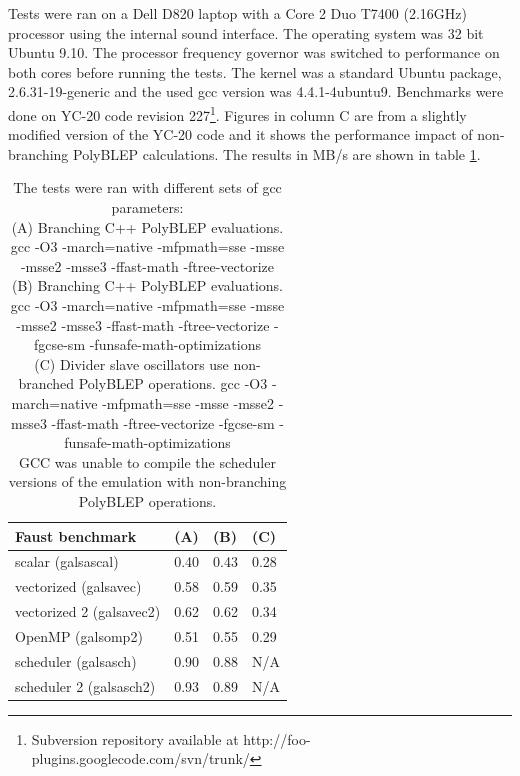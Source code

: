\documentclass[11pt,a4paper]{article}
\begin{document}
Tests were ran on a Dell D820 laptop with a Core 2 Duo T7400 (2.16GHz) processor using the internal sound interface. The operating system was 32 bit Ubuntu 9.10. The processor frequency governor was switched to performance on both cores before running the tests. The kernel was a standard Ubuntu package, 2.6.31-19-generic and the used gcc version was 4.4.1-4ubuntu9. Benchmarks were done on YC-20 code revision 227\footnote{Subversion repository available at http://foo-plugins.googlecode.com/svn/trunk/}. Figures in column C are from a slightly modified version of the YC-20 code and it shows the performance impact of non-branching PolyBLEP calculations. The results in MB/s are shown in table \ref{table:performance}.

\begin{table}[h]
 \begin{center}
\begin{tabular}{|l|l|l|l|}

      \hline
      Faust benchmark          & (A)  & (B)  & (C) \\
      \hline\hline
      scalar (galsascal)       & 0.40 & 0.43 & 0.28 \\
      vectorized (galsavec)    & 0.58 & 0.59 & 0.35 \\
      vectorized 2 (galsavec2) & 0.62 & 0.62 & 0.34 \\
      OpenMP (galsomp2)        & 0.51 & 0.55 & 0.29 \\
      scheduler (galsasch)     & 0.90 & 0.88 & N/A \\
      scheduler 2 (galsasch2)  & 0.93 & 0.89 & N/A \\
      \hline

\end{tabular}
\caption{The tests were ran with different sets of gcc parameters: \\
(A) Branching C++ PolyBLEP evaluations. gcc -O3 -march=native -mfpmath=sse -msse -msse2 -msse3 -ffast-math -ftree-vectorize \\
(B) Branching C++ PolyBLEP evaluations. gcc -O3 -march=native -mfpmath=sse -msse -msse2 -msse3 -ffast-math -ftree-vectorize -fgcse-sm  -funsafe-math-optimizations \\
(C) Divider slave oscillators use non-branched PolyBLEP operations. gcc -O3 -march=native -mfpmath=sse -msse -msse2 -msse3 -ffast-math -ftree-vectorize -fgcse-sm  -funsafe-math-optimizations \\
GCC was unable to compile the scheduler versions of the emulation with non-branching PolyBLEP operations.\\
}\label{table:performance}
 \end{center}
\end{table}
\end{document}
